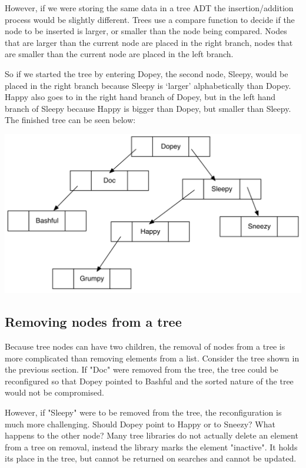 However, if we were storing the same data in a tree ADT the
insertion/addition process would be slightly different. Trees use a
compare function to decide if the node to be inserted is larger, or
smaller than the node being compared. Nodes that are larger than the
current node are placed in the right branch, nodes that are smaller than
the current node are placed in the left branch.

So if we started the tree by entering Dopey, the second node, Sleepy,
would be placed in the right branch because Sleepy is `larger'
alphabetically than Dopey. Happy also goes to in the right hand branch
of Dopey, but in the left hand branch of Sleepy because Happy is bigger
than Dopey, but smaller than Sleepy. The finished tree can be seen
below:

\includegraphics[width=6.00000in]{pictures/image4.png}

\subsection{Removing nodes from a tree}

Because tree nodes can have two children,  the removal of nodes from a tree is more complicated than removing elements from a list.  
Consider the tree shown in the previous section.   If "Doc" were removed from the tree,  the tree could be reconfigured so that Dopey pointed to Bashful and the sorted nature of the tree would not be compromised.

However,  if "Sleepy" were to be removed from the tree, the reconfiguration is much more challenging.  Should  Dopey point to Happy or to Sneezy?  What happens to the other node?    Many tree libraries do not actually delete an element from a tree on removal,  instead the library marks the element "inactive".   It holds its place in the tree, but cannot be returned on searches and cannot be updated.  

